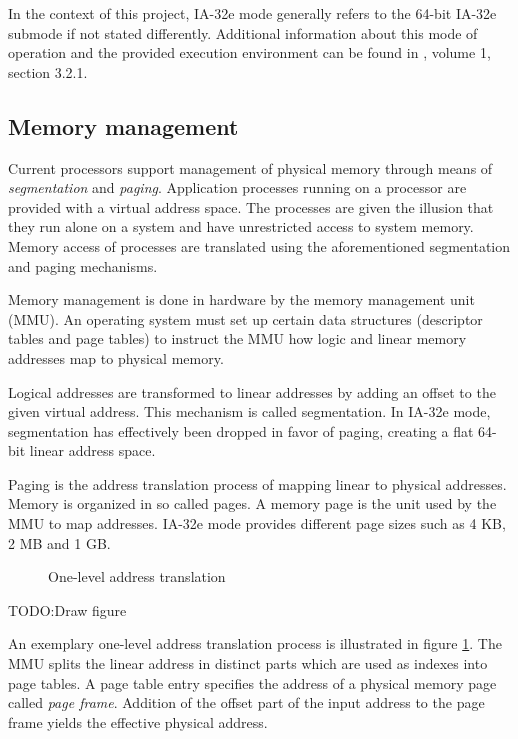 In the context of this project, IA-32e mode generally refers to the 64-bit
IA-32e submode if not stated differently. Additional information about this mode
of operation and the provided execution environment can be found in
\cite{IntelSDM}, volume 1, section 3.2.1.

\subsection{Memory management}
Current processors support management of physical memory through means of
\emph{segmentation} and \emph{paging}.
Application processes running on a processor are provided with a virtual
address space. The processes are given the illusion that they run alone on a
system and have unrestricted access to system memory. Memory access of
processes are translated using the aforementioned segmentation and paging
mechanisms.

Memory management is done in hardware by the memory management unit
(MMU).  An operating system must set up certain data structures
(descriptor tables and page tables) to instruct the MMU how logic and linear
memory addresses map to physical memory.

Logical addresses are transformed to linear addresses by adding an offset to
the given virtual address. This mechanism is called segmentation. In IA-32e
mode, segmentation has effectively been dropped in favor of paging, creating a
flat 64-bit linear address space.

Paging is the address translation process of mapping linear to physical
addresses. Memory is organized in so called pages. A memory page is the unit
used by the MMU to map addresses. IA-32e mode provides different page sizes
such as 4 KB, 2 MB and 1 GB.

\begin{figure}[h]
	\centering
	
	\caption{One-level address translation}
	\label{fig:address-translation}
\end{figure}
TODO:Draw figure

An exemplary one-level address translation process is illustrated in figure
\ref{fig:address-translation}. The MMU splits the linear address in distinct
parts which are used as indexes into page tables. A page table entry specifies
the address of a physical memory page called \emph{page frame}.  Addition of the
offset part of the input address to the page frame yields the effective physical
address.

